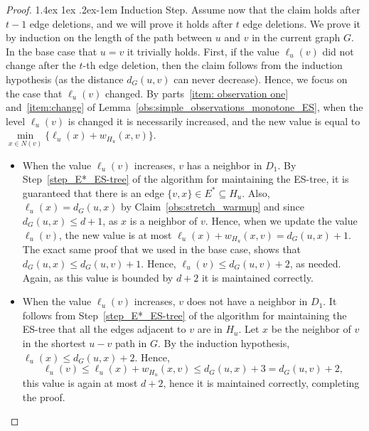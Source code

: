 \documentclass[11pt]{article}
\makeatletter
\theoremstyle{definition}
\theoremstyle{remark}
\renewcommand{\paragraph}{%
  \@startsection{paragraph}{4}%
  {\z@}{1.4ex \@plus 1ex \@minus .2ex}{-1em}%
  {\normalfont\normalsize\bfseries}%
}
\makeatother
\begin{document}
\begin{proof}
\paragraph{Induction Step.} Assume now that the claim holds after $t-1$ edge deletions, and we will prove it holds after $t$ edge deletions. We prove it by induction on the length of the path between $u$ and $v$ in the current graph $G$. In the base case that $u=v$ it trivially holds.
First, if the value $\ell_u(v)$ did not change after the $t$-th edge deletion, then the claim follows from the induction hypothesis (as the distance $d_G(u,v)$ can never decrease). Hence, we focus on the case that $\ell_u(v)$ changed. By parts~\ref{item: observation one} and~\ref{item:change} of Lemma~\ref{obs:simple_observations_monotone_ES}, when the level $\ell_u(v)$ is changed it is necessarily increased, and the new value is equal to $\min\limits_{x\in N(v)} \{\ell_u(x)+w_{H_u}(x,v) \}$. 

\begin{itemize}
    \item [Case 1:] When the value $\ell_u(v)$ increases, $v$ has a neighbor in $D_1$. By Step~\ref{step_E*_ES-tree} of the algorithm for maintaining the ES-tree, it is guaranteed that there is an edge $\{v,x\} \in E^* \subseteq H_u$. Also, $\ell_u(x)=d_G(u,x)$ by Claim~\ref{obs:stretch_warmup} and since $d_G(u,x) \leq d+1$, as $x$ is a neighbor of $v$. Hence, when we update the value $\ell_u(v)$, the new value is at most $\ell_u(x)+w_{H_u}(x,v)=d_G(u,x)+1.$ The exact same proof that we used in the base case, shows that $d_G(u,x) \leq d_G(u,v)+1$. Hence, $\ell_u(v) \leq d_G(u,v) +2$, as needed. Again, as this value is bounded by $d+2$ it is maintained correctly.
    \item [Case 2:] When the value $\ell_u(v)$ increases, $v$ does not have a neighbor in $D_1$. It follows from Step~\ref{step_E*_ES-tree} of the algorithm for maintaining the ES-tree that all the edges adjacent to $v$ are in $H_u$. Let $x$ be the neighbor of $v$ in the shortest $u-v$ path in $G$. By the induction hypothesis, $\ell_u(x) \leq d_G(u,x)+2$. Hence, $$\ell_u(v) \leq \ell_u(x)+w_{H_u}(x,v) \leq d_G(u,x)+3 = d_G(u,v)+2,$$ this value is again at most $d+2$, hence it is maintained correctly, completing the proof.\qedhere
\end{itemize}
\end{proof}
\end{document}
